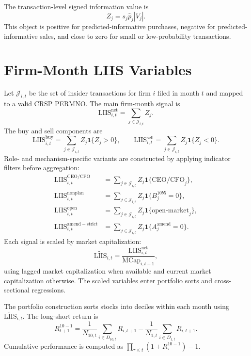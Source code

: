 \documentclass[11pt]{article}
\newcommand{\LIIS}{\mathrm{LIIS}}
\newcommand{\one}{\mathbf{1}}
\begin{document}
The transaction-level signed information value is
\begin{equation}
Z_j = s_j \widehat{p}_j |V_j|.
\end{equation}
This object is positive for predicted-informative purchases, negative for
predicted-informative sales, and close to zero for small or low-probability
transactions.

\section{Firm-Month LIIS Variables}

Let $\mathcal{J}_{i,t}$ be the set of insider transactions for firm $i$ filed in
month $t$ and mapped to a valid CRSP PERMNO. The main firm-month signal is
\begin{equation}
\LIIS^{\mathrm{net}}_{i,t} =
\sum_{j\in\mathcal{J}_{i,t}} Z_j.
\end{equation}
The buy and sell components are
\begin{equation}
\LIIS^{\mathrm{buy}}_{i,t} =
\sum_{j\in\mathcal{J}_{i,t}} Z_j \one\{Z_j>0\},\qquad
\LIIS^{\mathrm{sell}}_{i,t} =
\sum_{j\in\mathcal{J}_{i,t}} Z_j \one\{Z_j<0\}.
\end{equation}
Role- and mechanism-specific variants are constructed by applying indicator
filters before aggregation:
\begin{align}
\LIIS^{\mathrm{CEO/CFO}}_{i,t} &=
\sum_{j\in\mathcal{J}_{i,t}} Z_j \one\{\text{CEO/CFO}_j\},\\
\LIIS^{\mathrm{nonplan}}_{i,t} &=
\sum_{j\in\mathcal{J}_{i,t}} Z_j \one\{B^{10b5}_j=0\},\\
\LIIS^{\mathrm{open}}_{i,t} &=
\sum_{j\in\mathcal{J}_{i,t}} Z_j \one\{\text{open-market}_j\},\\
\LIIS^{\mathrm{amend-strict}}_{i,t} &=
\sum_{j\in\mathcal{J}_{i,t}} Z_j \one\{A^{\mathrm{amend}}_j=0\}.
\end{align}
Each signal is scaled by market capitalization:
\begin{equation}
\widetilde{\LIIS}_{i,t} =
\frac{\LIIS^{\mathrm{net}}_{i,t}}{\mathrm{MCap}_{i,t-1}},
\end{equation}
using lagged market capitalization when available and current market
capitalization otherwise. The scaled variables enter portfolio sorts and
cross-sectional regressions.

The portfolio construction sorts stocks into deciles within each month using
$\widetilde{\LIIS}_{i,t}$. The long-short return is
\begin{equation}
R^{10-1}_{t+1} =
\frac{1}{N_{10,t}}\sum_{i\in D_{10,t}} R_{i,t+1}
-
\frac{1}{N_{1,t}}\sum_{i\in D_{1,t}} R_{i,t+1}.
\end{equation}
Cumulative performance is computed as $\prod_{\tau\leq t}(1+R^{10-1}_{\tau})-1$.
\end{document}

